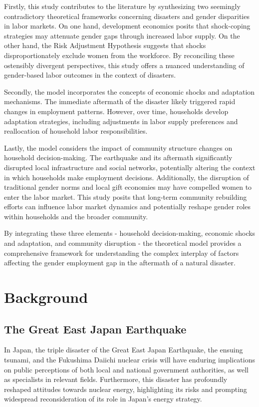 \documentclass[a4paper,12pt]{article}
\begin{document}
Firstly, this study contributes to the literature by synthesizing two seemingly contradictory theoretical frameworks concerning disasters and gender disparities in labor markets. On one hand, development economics posits that shock-coping strategies may attenuate gender gaps through increased labor supply. On the other hand, the Risk Adjustment Hypothesis suggests that shocks disproportionately exclude women from the workforce. By reconciling these ostensibly divergent perspectives, this study offers a nuanced understanding of gender-based labor outcomes in the context of disasters.

Secondly, the model incorporates the concepts of economic shocks and adaptation mechanisms. The immediate aftermath of the disaster likely triggered rapid changes in employment patterns. However, over time, households develop adaptation strategies, including adjustments in labor supply preferences and reallocation of household labor responsibilities.

Lastly, the model considers the impact of community structure changes on household decision-making. The earthquake and its aftermath significantly disrupted local infrastructure and social networks, potentially altering the context in which households make employment decisions. Additionally, the disruption of traditional gender norms and local gift economies may have compelled women to enter the labor market. This study posits that long-term community rebuilding efforts can influence labor market dynamics and potentially reshape gender roles within households and the broader community.

By integrating these three elements - household decision-making, economic shocks and adaptation, and community disruption - the theoretical model provides a comprehensive framework for understanding the complex interplay of factors affecting the gender employment gap in the aftermath of a natural disaster.

\section{Background}
\label{sec2}

\subsection{The Great East Japan Earthquake }
\label{sec5.1}

 In Japan, the triple disaster of the Great East Japan Earthquake, the ensuing tsunami, and the Fukushima Daiichi nuclear crisis will have enduring implications on public perceptions of both local and national government authorities, as well as specialists in relevant fields. Furthermore, this disaster has profoundly reshaped attitudes towards nuclear energy, highlighting its risks and prompting widespread reconsideration of its role in Japan's energy strategy.
\end{document}

